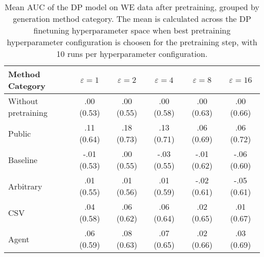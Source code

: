\begin{table}[h!]
    \centering
    \caption{Mean AUC of the DP model on WE data after pretraining, grouped by generation method category. The mean is calculated across the DP finetuning hyperparameter space when best pretraining hyperparameter configuration is choosen for the pretraining step, with 10 runs per hyperparameter configuration.}
    \label{tab:epsilon_comparison}
    \begin{tabular}{lccccc}
    \toprule
    Method Category & $\varepsilon=1$ & $\varepsilon=2$ & $\varepsilon=4$ & $\varepsilon=8$ & $\varepsilon=16$ \\
    \midrule
    Without pretraining & .00 {\small (0.53)} & .00 {\small (0.55)} & .00 {\small (0.58)} & .00 {\small (0.63)} & .00 {\small (0.66)} \\
    \arrayrulecolor{black!50!}\midrule
    Public & \cellcolor{gold!30}.11 {\small (0.64)} & \cellcolor{gold!30}.18 {\small (0.73)} & \cellcolor{gold!30}.13 {\small (0.71)} & \cellcolor{gold!30}.06 {\small (0.69)} & \cellcolor{gold!30}.06 {\small (0.72)} \\
    \arrayrulecolor{black!50!}\midrule
    Baseline & -.01 {\small (0.53)} & .00 {\small (0.55)} & -.03 {\small (0.55)} & -.01 {\small (0.62)} & -.06 {\small (0.60)} \\
    \arrayrulecolor{black!50!}\midrule
    Arbitrary & .01 {\small (0.55)} & .01 {\small (0.56)} & .01 {\small (0.59)} & -.02 {\small (0.61)} & -.05 {\small (0.61)} \\
    \arrayrulecolor{black!50!}\midrule
    CSV & \cellcolor{bronze!30}.04 {\small (0.58)} & \cellcolor{bronze!30}.06 {\small (0.62)} & \cellcolor{bronze!30}.06 {\small (0.64)} & \cellcolor{bronze!30}.02 {\small (0.65)} & \cellcolor{bronze!30}.01 {\small (0.67)} \\
    Agent & \cellcolor{silver!30}.06 {\small (0.59)} & \cellcolor{silver!30}.08 {\small (0.63)} & \cellcolor{silver!30}.07 {\small (0.65)} & \cellcolor{silver!30}.02 {\small (0.66)} & \cellcolor{silver!30}.03 {\small (0.69)} \\
    \bottomrule
    \end{tabular}
\end{table}